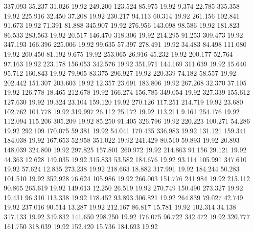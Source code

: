  337.093   35.237   31.026        19.92
 249.200  123.524   85.975        19.92
   9.374   22.785  335.358        19.92
 225.916   32.450   37.208        19.92
 230.217   94.113   60.314        19.92
 261.156  102.841   91.673        19.92
  71.391   81.888  345.907        19.92
 276.956  143.098   98.586        19.92
 181.823   86.533  283.563        19.92
  20.517  146.470  318.306        19.92
 214.295   91.253  309.473        19.92
 347.193  166.396  225.006        19.92
  99.635   57.397  278.491        19.92
  34.483   84.498  111.080        19.92
 200.450   81.192    9.675        19.92
 253.065   26.916   45.232        19.92
 200.177   52.764   97.163        19.92
 223.178  156.053  342.576        19.92
 351.971  144.169  311.639        19.92
  15.640   95.712  160.843        19.92
  79.905   83.375  296.927        19.92
 220.339   74.182   58.557        19.92
 202.442  151.307  203.603        19.92
  12.357   23.691  183.806        19.92
 267.268   32.370   37.105        19.92
 126.778   18.465  212.678        19.92
 166.274  156.785  349.054        19.92
 327.339  155.612  127.630        19.92
  19.324   23.104  159.120        19.92
 270.126  117.251  214.719        19.92
  23.680  102.762  101.778        19.92
 319.997   26.112   25.172        19.92
 113.211    9.161  254.176        19.92
 112.094  115.206  305.209        19.92
  85.250   91.405  326.796        19.92
 220.223  100.271   54.286        19.92
 292.109  170.075   59.381        19.92
  54.041  170.435  336.983        19.92
 131.121  159.341  184.038        19.92
 167.653   52.958  351.022        19.92
 241.429   80.510   59.893        19.92
  20.893  148.039  324.800        19.92
 297.825  157.801  260.972        19.92
 214.863   91.156   29.121        19.92
  44.363   12.628  149.035        19.92
 315.833   53.582  184.676        19.92
  93.114  105.991  347.610        19.92
  57.624   12.835  273.238        19.92
 218.663   18.882  317.991        19.92
 184.244   50.283  101.510        19.92
 352.928   76.624  105.986        19.92
 266.003  151.776  241.984        19.92
 215.112   90.865  265.619        19.92
 149.613   12.250   26.519        19.92
 270.749  150.490  273.327        19.92
  19.431   96.310  113.338        19.92
 178.452   93.893  306.821        19.92
 264.839   79.027   42.749        19.92
 237.016   90.514   13.287        19.92
 212.167   86.817   15.781        19.92
 102.314   34.138  317.133        19.92
 349.832  141.650  298.250        19.92
 176.075   96.722  342.472        19.92
 320.777  161.750  318.039        19.92
 152.420   15.736  184.693        19.92
